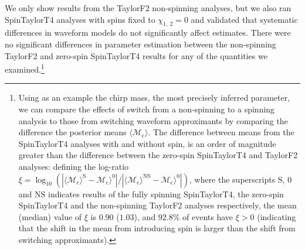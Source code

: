 We only show results from the TaylorF2 non-spinning analyses, but we also ran SpinTaylorT4 analyses with spins fixed to $\chi_{1,~2}=0$ and validated that systematic differences in waveform models do not significantly affect estimates. There were no significant differences in parameter estimation between the non-spinning TaylorF2 and zero-spin SpinTaylorT4 results for any of the quantities we examined.\footnote{Using as an example the chirp mass, the most precisely inferred parameter, we can compare the effects of switch from a non-spinning to a spinning analysis to those from switching waveform approximants by comparing the difference the posterior means $\langle \mathcal{M}_\mathrm{c}\rangle$. The difference between means from the SpinTaylorT4 analyses with and without spin, is an order of magnitude greater than the difference between the zero-spin SpinTaylorT4 and TaylorF2 analyses: defining the log-ratio $\xi = \log_{10}(|\langle \mathcal{M}_\mathrm{c}\rangle^\mathrm{S} - \mathcal{M}_\mathrm{c}\rangle^0|/|\langle \mathcal{M}_\mathrm{c}\rangle^\mathrm{NS} - \mathcal{M}_\mathrm{c}\rangle^0|)$, where the superscripts $\mathrm{S}$, $0$ and $\mathrm{NS}$ indicates results of the fully spinning SpinTaylorT4, the zero-spin SpinTaylorT4 and the non-spinning TaylorF2 analyses respectively, the mean (median) value of $\xi$ is $0.90$ ($1.03$), and $92.8\%$ of events have $\xi > 0$ (indicating that the shift in the mean from introducing spin is larger than the shift from switching approximants).}
  
  
  
  
  
  
  
  
  
  
  
  
  
  
  
  
  